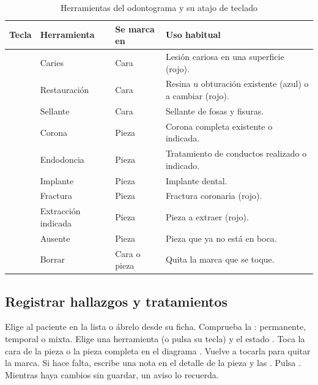 \documentclass[11pt]{article}
\begin{document}
\begin{table}[H]
\centering\small
\caption{Herramientas del odontograma y su atajo de teclado}\label{tab:herramientas}
\begin{tabularx}{\linewidth}{@{}C{1.2cm}P{3.6cm}P{2.2cm}L@{}}
\toprule
\textbf{Tecla} & \textbf{Herramienta} & \textbf{Se marca en} & \textbf{Uso habitual} \\
\midrule
{} & Caries & Cara & Lesión cariosa en una superficie (rojo). \\
 & Restauración & Cara & Resina u obturación existente (azul) o a cambiar (rojo). \\
 & Sellante & Cara & Sellante de fosas y fisuras. \\
 & Corona & Pieza & Corona completa existente o indicada. \\
 & Endodoncia & Pieza & Tratamiento de conductos realizado o indicado. \\
 & Implante & Pieza & Implante dental. \\
 & Fractura & Pieza & Fractura coronaria (rojo). \\
 & Extracción indicada & Pieza & Pieza a extraer (rojo). \\
 & Ausente & Pieza & Pieza que ya no está en boca. \\
 & Borrar & Cara o pieza & Quita la marca que se toque. \\
\bottomrule
\end{tabularx}
\end{table}

\subsection{Registrar hallazgos y tratamientos}

\begin{pasos}
  \paso Elige al paciente en la lista  o ábrelo desde su ficha.
  \paso Comprueba la  : permanente, temporal o mixta.
  \paso Elige una herramienta  (o pulsa su tecla) y el estado .
  \paso Toca la cara de la pieza o la pieza completa en el diagrama . Vuelve a tocarla para quitar la marca.
  \paso Si hace falta, escribe una nota en el detalle de la pieza  y las  .
  \paso Pulsa . Mientras haya cambios sin guardar, un aviso lo recuerda.
\end{pasos}
\end{document}

